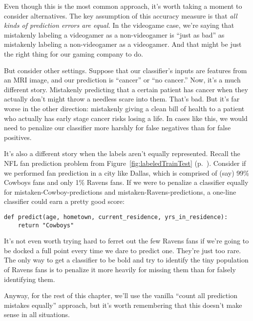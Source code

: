 Even though this is the most common approach, it's worth taking a moment to
consider alternatives. The key assumption of this accuracy measure is that
\textit{all kinds of prediction errors are equal.} In the videogame case, we're
saying that mistakenly labeling a videogamer as a non-videogamer is ``just as
bad'' as mistakenly labeling a non-videogamer as a videogamer. And that might
be just the right thing for our gaming company to do.

But consider other settings. Suppose that our classifier's inputs are features
from an MRI image, and our prediction is ``cancer'' or ``no cancer.'' Now, it's
a much different story. Mistakenly predicting that a certain patient has cancer
when they actually don't might throw a needless scare into them. That's bad.
But it's far worse in the other direction: mistakenly giving a clean bill of
health to a patient who actually has early stage cancer risks losing a life. In
cases like this, we would need to penalize our classifier more harshly for
false negatives than for false positives.

It's also a different story when the labels aren't equally represented. Recall
the NFL fan prediction problem from Figure~\ref{fig:labeledTrainTest}
(p.~\pageref{fig:labeledTrainTest}). Consider if we performed fan prediction in
a city like Dallas, which is comprised of (say) 99\% Cowboys fans and only 1\%
Ravens fans. If we were to penalize a classifier equally for
mistaken-Cowboy-predictions and mistaken-Ravens-predictions, a one-line
classifier could earn a pretty good score:

\begin{Verbatim}[fontsize=\footnotesize,samepage=true,frame=single,framesep=3mm]
def predict(age, hometown, current_residence, yrs_in_residence):
    return "Cowboys"
\end{Verbatim}
 
It's not even worth trying hard to ferret out the few Ravens fans if we're
going to be docked a full point every time we dare to predict one. They're just
too rare. The only way to get a classifier to be bold and try to identify the
tiny population of Ravens fans is to penalize it more heavily for missing
them than for falsely identifying them.

Anyway, for the rest of this chapter, we'll use the vanilla ``count all
prediction mistakes equally'' approach, but it's worth remembering that this
doesn't make sense in all situations.

